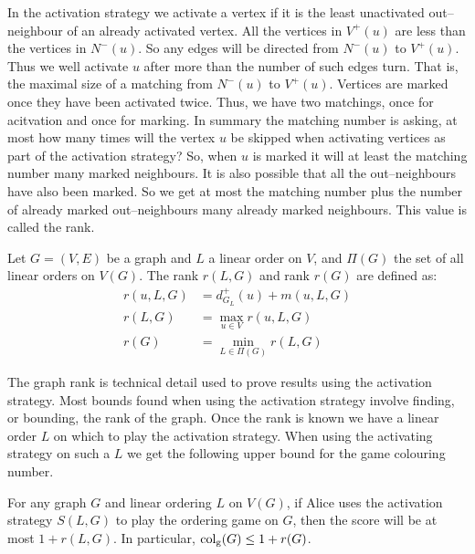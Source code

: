 In the activation strategy we activate a vertex if it is the least unactivated out--neighbour of an already activated vertex. All the vertices in $V^+(u)$ are less than the vertices in $N^-(u)$. So any edges will be directed from $N^-(u)$ to $V^+(u)$. Thus we well activate $u$ after more than the number of such edges turn. That is, the maximal size of a matching from $N^-(u)$ to $V^+(u)$. Vertices are marked once they have been activated twice. Thus, we have two matchings, once for acitvation and once for marking. In summary the matching number is asking, at most how many times will the vertex $u$ be skipped when activating vertices as part of the activation strategy? So, when $u$ is marked it will at least the matching number many marked neighbours. It is also possible that all the out--neighbours have also been marked. So we get at most the matching number plus the number of already marked out--neighbours many already marked neighbours. This value is called the rank.
  
\begin{definition} \label{defnRank}
    Let $G=(V,E)$ be a graph and $L$ a linear order on $V$, and $\Pi(G)$ the set of all linear orders on $V(G)$. The rank $r(L,G)$ and rank $r(G)$ are defined as:
    \begin{align*}
    r(u,L,G) & = d^+_{G_L}(u) + m(u,L,G) \\
    r(L,G)   & = \max_{u \in V}r(u,L,G)  \\
    r(G)     & = \min_{L \in \Pi(G)} r(L,G)
    \end{align*}
\end{definition}

The graph rank is technical detail used to prove results using the activation strategy. Most bounds found when using the activation strategy involve finding, or bounding, the rank of the graph. Once the rank is known we have a linear order $L$ on which to play the activation strategy. When using the activating strategy on such a $L$ we get the following upper bound for the game colouring number. 

\begin{theorem} \label{thm:KIERSTEAD1}
    For any graph $G$ and linear ordering $L$ on $V(G)$, if Alice uses the activation strategy $S(L, G)$ to play the ordering game on $G$, then the score will be at most $1+r(L, G)$. In particular, $\operatorname{col_g}(G) \leq 1+r(G)$.
\end{theorem}

